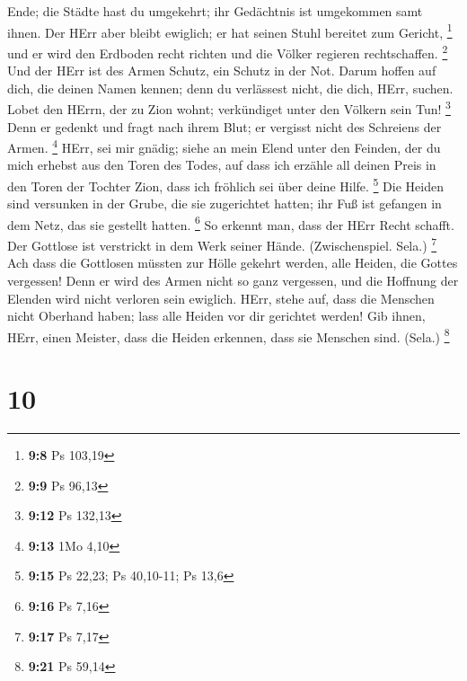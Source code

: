 Ende; die Städte hast du umgekehrt; ihr Gedächtnis ist umgekommen samt
ihnen.  Der HErr aber bleibt ewiglich; er hat seinen Stuhl
bereitet zum Gericht, \footnote{\textbf{9:8} Ps 103,19}  und
er wird den Erdboden recht richten und die Völker regieren
rechtschaffen. \footnote{\textbf{9:9} Ps 96,13}  Und der
HErr ist des Armen Schutz, ein Schutz in der Not.  Darum
hoffen auf dich, die deinen Namen kennen; denn du verlässest nicht, die
dich, HErr, suchen.  Lobet den HErrn, der zu Zion wohnt;
verkündiget unter den Völkern sein Tun! \footnote{\textbf{9:12} Ps
  132,13}  Denn er gedenkt und fragt nach ihrem Blut; er
vergisst nicht des Schreiens der Armen. \footnote{\textbf{9:13} 1Mo 4,10}
 HErr, sei mir gnädig; siehe an mein Elend unter den
Feinden, der du mich erhebst aus den Toren des Todes,  auf
dass ich erzähle all deinen Preis in den Toren der Tochter Zion, dass
ich fröhlich sei über deine Hilfe. \footnote{\textbf{9:15} Ps 22,23; Ps
  40,10-11; Ps 13,6}  Die Heiden sind versunken in der
Grube, die sie zugerichtet hatten; ihr Fuß ist gefangen in dem Netz, das
sie gestellt hatten. \footnote{\textbf{9:16} Ps 7,16}  So
erkennt man, dass der HErr Recht schafft. Der Gottlose ist verstrickt in
dem Werk seiner Hände. (Zwischenspiel. Sela.) \footnote{\textbf{9:17} Ps
  7,17}  Ach dass die Gottlosen müssten zur Hölle gekehrt
werden, alle Heiden, die Gottes vergessen!  Denn er wird
des Armen nicht so ganz vergessen, und die Hoffnung der Elenden wird
nicht verloren sein ewiglich.  HErr, stehe auf, dass die
Menschen nicht Oberhand haben; lass alle Heiden vor dir gerichtet
werden!  Gib ihnen, HErr, einen Meister, dass die Heiden
erkennen, dass sie Menschen sind. (Sela.) \footnote{\textbf{9:21} Ps
  59,14}

\hypertarget{section-5}{%
\section{10}\label{section-5}}

